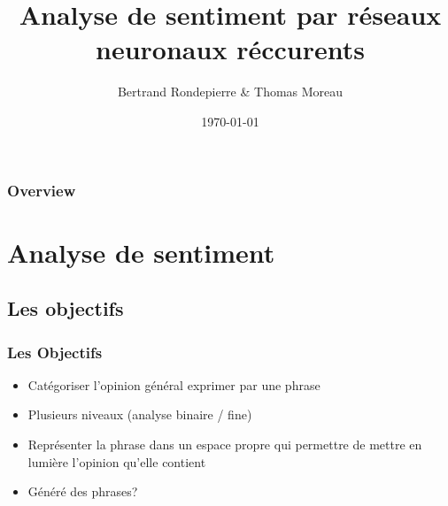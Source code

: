 \documentclass{beamer}
\title[Sentiment analysis with RNN]{Analyse de sentiment par réseaux neuronaux réccurents} %
\author{Bertrand Rondepierre \& Thomas Moreau} %
\institute[] %
{
Télécom paristech - MDI343 \\
}
\date{\today} %
\begin{document}
\begin{frame}
\titlepage %
\end{frame}

\begin{frame}
\frametitle{Overview} %
\tableofcontents %
\end{frame}


\section{Analyse de sentiment} %

\subsection{Les objectifs}


\begin{frame}
\frametitle{Les Objectifs}
\begin{itemize}\setlength{\itemsep}{5mm}
\item Catégoriser l'opinion général exprimer par une phrase
\item Plusieurs niveaux (analyse binaire / fine)
\item Représenter la phrase dans un espace propre qui permettre de mettre en lumière l'opinion qu'elle contient
\item Généré des phrases?
\end{itemize}
\end{frame}
\end{document}
